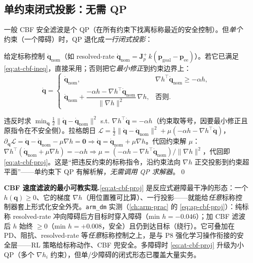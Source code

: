 \subsection{单约束闭式投影：无需 QP}
\label{subsec:at-cbf-proj}

一般 CBF 安全滤波是个 QP（在所有约束下找离标称最近的安全控制）。但\emph{单个}约束（一个障碍）时，QP 退化成\emph{一行闭式投影}：

\begin{proposition}\label{prop:at-cbf-proj}
给定标称控制 $\dot{\mathbf{q}}_{\mathrm{nom}}$（如 resolved-rate $\dot{\mathbf{q}}_{\mathrm{nom}}=\mathbf{J}_p^{+}\,k(\mathbf{p}_{\mathrm{goal}}-\mathbf{p}_{\mathrm{ee}})$）。若它已满足 \cref{eq:at-cbf-ineq}，直接采用；否则把它\emph{最小修正}到约束边界上：
\begin{equation}
  \dot{\mathbf{q}}=
  \begin{cases}
    \dot{\mathbf{q}}_{\mathrm{nom}}, & \nabla h^\top\dot{\mathbf{q}}_{\mathrm{nom}}\ge -\alpha h,\\[4pt]
    \dot{\mathbf{q}}_{\mathrm{nom}}+\dfrac{-\alpha h-\nabla h^\top\dot{\mathbf{q}}_{\mathrm{nom}}}{\|\nabla h\|^2}\,\nabla h, & \text{否则}.
  \end{cases}
  \label{eq:at-cbf-proj}
\end{equation}
\end{proposition}

\begin{derivation}\label{der:at-cbf-proj}
违反时求 $\min_{\dot{\mathbf{q}}}\tfrac12\|\dot{\mathbf{q}}-\dot{\mathbf{q}}_{\mathrm{nom}}\|^2$ s.t. $\nabla h^\top\dot{\mathbf{q}}=-\alpha h$（约束取等号，因要最小修正且原指令在不安全侧）。拉格朗日 $\mathcal{L}=\tfrac12\|\dot{\mathbf{q}}-\dot{\mathbf{q}}_{\mathrm{nom}}\|^2+\mu(-\alpha h-\nabla h^\top\dot{\mathbf{q}})$，$\partial_{\dot{\mathbf{q}}}\mathcal{L}=\dot{\mathbf{q}}-\dot{\mathbf{q}}_{\mathrm{nom}}-\mu\nabla h=\mathbf{0}\Rightarrow\dot{\mathbf{q}}=\dot{\mathbf{q}}_{\mathrm{nom}}+\mu\nabla h$。代回约束解 $\mu$：$\nabla h^\top(\dot{\mathbf{q}}_{\mathrm{nom}}+\mu\nabla h)=-\alpha h\Rightarrow\mu=(-\alpha h-\nabla h^\top\dot{\mathbf{q}}_{\mathrm{nom}})/\|\nabla h\|^2$，代回即 \cref{eq:at-cbf-proj}。这是“把违反约束的标称指令，沿约束法向 $\nabla h$ 正交投影到约束超平面”——单约束下 QP 有解析解，\emph{无需调用 QP 求解器}。\qed
\end{derivation}

\begin{insight}
\textbf{CBF 速度滤波的最小可教实现.}\;\cref{eq:at-cbf-proj} 是反应式避障最干净的形态：一个 $h(\mathbf{q})\ge 0$、它的梯度 $\nabla h$（用位置雅可比算）、一行投影——就能给\emph{任意}标称控制器套上形式化安全外壳。\texttt{arm\_dm} 实测（\cref{ch:arm-prac} 的 \cref{eq:ap-cbf-proj}）：纯标称 resolved-rate 冲向障碍后方目标时穿入障碍（min $h=-0.046$）；加 CBF 滤波后 $h$ 始终 $\ge 0$（min $h=+0.008$，安全）且仍到达目标（绕行）。它可叠加在 PD、阻抗、resolved-rate 等\emph{任意}标称控制之上，是与 P8 强化学习操作衔接的安全层——RL 策略给标称动作、CBF 兜安全。多障碍时 \cref{eq:at-cbf-proj} 升级为小 QP（多个 $\nabla h_i$ 约束），但单/少障碍的闭式形态已覆盖大量实务。
\end{insight}

